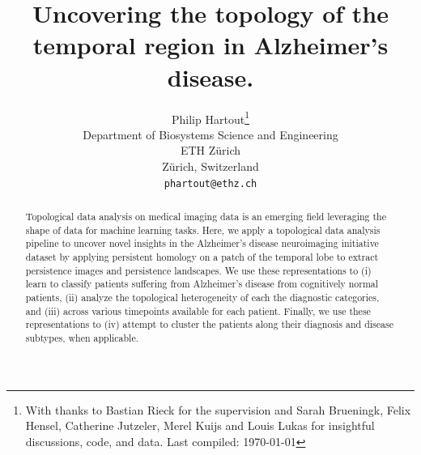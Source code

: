 \documentclass{article}
\title{Uncovering the topology of the temporal region in Alzheimer's disease.}
\author{%
  Philip Hartout\thanks{With thanks to Bastian Rieck for the supervision and Sarah Brueningk, Felix Hensel, Catherine Jutzeler, Merel Kuijs and Louis Lukas for insightful discussions, code, and data. Last compiled: \today}\\
  Department of Biosystems Science and Engineering\\
  ETH Zürich\\
  Zürich, Switzerland \\
  \texttt{phartout@ethz.ch} \\
}
\begin{document}
\maketitle

\begin{abstract}
Topological data analysis on medical imaging data is an emerging field leveraging the shape of data for machine learning tasks. Here, we apply a topological data analysis pipeline to uncover novel insights in the Alzheimer's disease neuroimaging initiative dataset by applying persistent homology on a patch of the temporal lobe to extract persistence images and persistence landscapes. We use these representations to (i) learn to classify patients suffering from Alzheimer's disease from cognitively normal patients, (ii) analyze the topological heterogeneity of each the diagnostic categories, and (iii) across various timepoints available for each patient. Finally, we use these representations to (iv) attempt to cluster the patients along their diagnosis and disease subtypes, when applicable.
\end{abstract}
\end{document}
